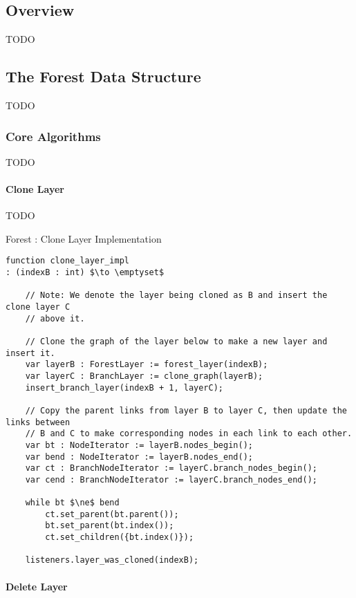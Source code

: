 \subsection{Overview}

TODO

\subsection{The Forest Data Structure}

TODO

\subsubsection{Core Algorithms}

TODO

\paragraph{Clone Layer}

TODO

\begin{stulisting}[p]
\caption{Forest : Clone Layer Implementation}
\label{code:ipfs-forest-clonelayerimpl}
\begin{lstlisting}[style=Default]
function clone_layer_impl
: (indexB : int) $\to \emptyset$

	// Note: We denote the layer being cloned as B and insert the clone layer C
	// above it.

	// Clone the graph of the layer below to make a new layer and insert it.
	var layerB : ForestLayer := forest_layer(indexB);
	var layerC : BranchLayer := clone_graph(layerB);
	insert_branch_layer(indexB + 1, layerC);

	// Copy the parent links from layer B to layer C, then update the links between
	// B and C to make corresponding nodes in each link to each other.
	var bt : NodeIterator := layerB.nodes_begin();
	var bend : NodeIterator := layerB.nodes_end();
	var ct : BranchNodeIterator := layerC.branch_nodes_begin();
	var cend : BranchNodeIterator := layerC.branch_nodes_end();

	while bt $\ne$ bend
		ct.set_parent(bt.parent());
		bt.set_parent(bt.index());
		ct.set_children({bt.index()});

	listeners.layer_was_cloned(indexB);
\end{lstlisting}
\end{stulisting}

\paragraph{Delete Layer}

